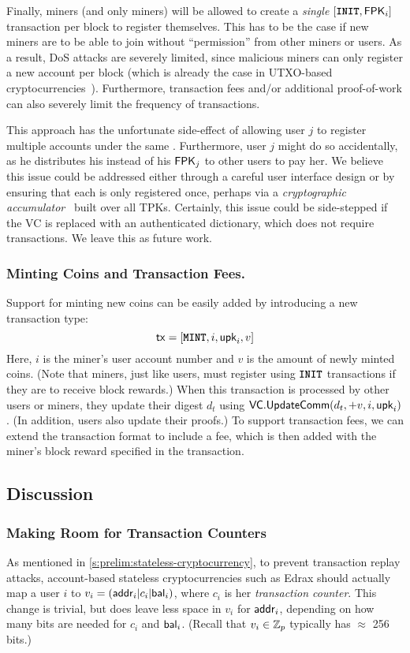 Finally, miners (and only miners) will be allowed to create a \textit{single} $[\texttt{\textbf{INIT}}, \mathbf{\mathsf{FPK}}_i]$ transaction per block to register themselves.
This has to be the case if new miners are to be able to join without ``permission'' from other miners or users.
As a result, DoS attacks are severely limited, since malicious miners can only register a new account per block (which is already the case in UTXO-based cryptocurrencies~\cite{Nakamoto08}).
Furthermore, transaction fees and/or additional proof-of-work can also severely limit the frequency of \initspendtxn transactions.

This approach has the unfortunate side-effect of allowing user $j$ to register multiple accounts under the same \tpk.
Furthermore, user $j$ might do so accidentally, as he distributes his \tpk instead of his $\mathbf{\mathsf{FPK}}_j$ to other users to pay her.
We believe this issue could be addressed either through a careful user interface design or by ensuring that each \tpk is only registered once, perhaps via a \textit{cryptographic accumulator}~\cite{Bd93,Nguyen05} built over all TPKs.
Certainly, this issue could be side-stepped if the VC is replaced with an authenticated dictionary, which does not require \inittxn transactions.
We leave this as future work.

\subsubsection{Minting Coins and Transaction Fees.}
Support for minting new coins can be easily added by introducing a new \minttxn transaction type:
$$\mathsf{tx} = [\texttt{\textbf{MINT}}, i, \mathsf{upk}_i, v]$$
Here, $i$ is the miner's user account number and $v$ is the amount of newly minted coins.
(Note that miners, just like users, must register using $\texttt{\textbf{INIT}}$ transactions if they are to receive block rewards.)
When this \minttxn transaction is processed by other users or miners, they update their digest $d_t$ using $\mathsf{VC}.\mathsf{UpdateComm}(d_t, +v, i, \mathsf{upk}_i)$.
(In addition, users also update their proofs.)
To support transaction fees, we can extend the \spendtxn transaction format to include a fee, which is then added with the miner's block reward specified in the \minttxn transaction.

\subsection{Discussion}

\subsubsection{Making Room for Transaction Counters}
\label{s:discussion:txn-counters}
As mentioned in \cref{s:prelim:stateless-cryptocurrency}, to prevent transaction replay attacks, account-based stateless cryptocurrencies such as Edrax should actually map a user $i$ to $v_i = (\mathsf{addr}_i\vert c_i\vert\mathsf{bal}_i)$, where $c_i$ is her \textit{transaction counter}.
This change is trivial, but does leave less space in $v_i$ for $\mathsf{addr}_i$, depending on how many bits are needed for $c_i$ and $\mathsf{bal}_i$.
(Recall that $v_i\in\mathbb{Z}_p$ typically has $\approx$ 256 bits.)

